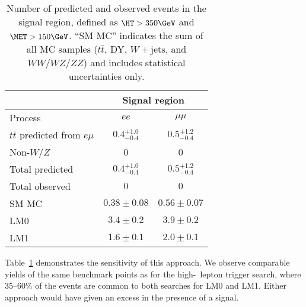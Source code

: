 \begin{table}[hbt]
\begin{center}
\caption{\label{tab:results}
Number of predicted and observed events in the signal region, defined as $\HT > 350\GeV$ and $\MET> 150\GeV$.
``SM MC'' indicates the sum of all MC samples ($t\bar{t}$, DY, $W+\textrm{jets}$, and $WW/WZ/ZZ$)
and includes statistical uncertainties only.
}
\vspace{2 mm}
\begin{tabular}{l|cc}
\hline
                                    &   \multicolumn{2}{c}{Signal region}          \\
\hline 
Process                             & $ee$                   & $\mu\mu$  \\
\hline
$t\bar{t}$ predicted from $e\mu$    & $0.4 {}_{-0.4}^{+1.0}$ & $0.5 {}_{-0.4}^{+1.2}$  \\
Non-$W/Z$                           & 0                      & 0                        \\
\hline
Total predicted                     & $0.4 {}_{-0.4}^{+1.0}$ & $0.5 {}_{-0.4}^{+1.2}$   \\
\hline\hline   
Total observed                      & $0$                    & $0$  \\
\hline \hline
SM MC                               & $0.38\pm 0.08$         & $0.56 \pm 0.07$ \\
LM0                                 & $3.4\pm0.2$            & $3.9\pm0.2$  \\
LM1                                 & $1.6\pm0.1$            & $2.0\pm0.1$  \\

\hline
\end{tabular}
\end{center}
\end{table}

Table~\ref{tab:results} demonstrates the sensitivity of this approach. 
We observe comparable yields of the same benchmark points as for the high-\pt\  
lepton trigger search, where 35--60\% of the events are common to both 
searches for LM0 and LM1. 
Either approach would have given an excess in the presence of a signal.
